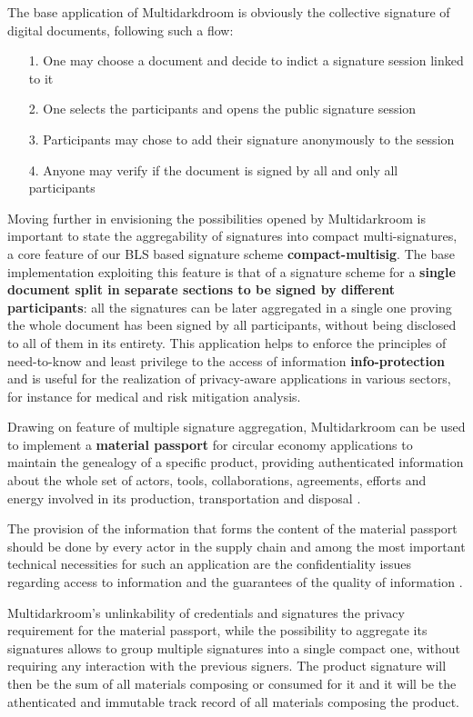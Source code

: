 \documentclass[twocolumn]{article}
\begin{document}
The base application of Multidarkdroom is obviously the collective
signature of digital documents, following such a flow:

\begin{itemize}
  \item[1.] One may choose a document and decide to indict a signature
  session linked to it
  \item[2.] One selects the participants and opens the public signature session
  \item[3.] Participants may chose to add their signature anonymously to the session 
  \item[4.] Anyone may verify if the document is signed by all and only all participants
\end{itemize}

Moving further in envisioning the possibilities opened by Multidarkroom
is important to state the aggregability of signatures into compact
multi-signatures, a core feature of our BLS based signature scheme
\textbf{compact-multisig}. The base implementation exploiting this
feature is that of a signature scheme for a \textbf{single document
split in separate sections to be signed by different participants}: all
the signatures can be later aggregated in a single one proving the whole
document has been signed by all participants, without being disclosed to
all of them in its entirety. This application helps to enforce the
principles of need-to-know and least privilege to the access of
information \textbf{info-protection} and is useful for the realization
of privacy-aware applications in various sectors, for instance for
medical and risk mitigation analysis.

Drawing on feature of multiple signature aggregation, Multidarkroom can
be used to implement a \textbf{material passport} for circular economy
applications \citep{material-passport} to maintain the genealogy of a
specific product, providing authenticated information about  the whole
set of actors, tools, collaborations, agreements, efforts and energy
involved in its production, transportation and disposal
\citep{reflow-os}.

The provision of the information that forms the content of the material
passport should be done by every actor in the supply chain and among the
most important technical necessities for such an application are the
confidentiality issues regarding access to information and the
guarantees of the quality of information \citep{resources-passport}.

Multidarkroom's unlinkability of credentials and signatures the privacy
requirement for the material passport, while the possibility to
aggregate its signatures allows to group multiple signatures into a
single compact one, without requiring any interaction with the previous
signers. The product signature will then be the sum of all materials
composing or consumed for it and it will be the athenticated and
immutable track record of all materials composing the product.
\end{document}
